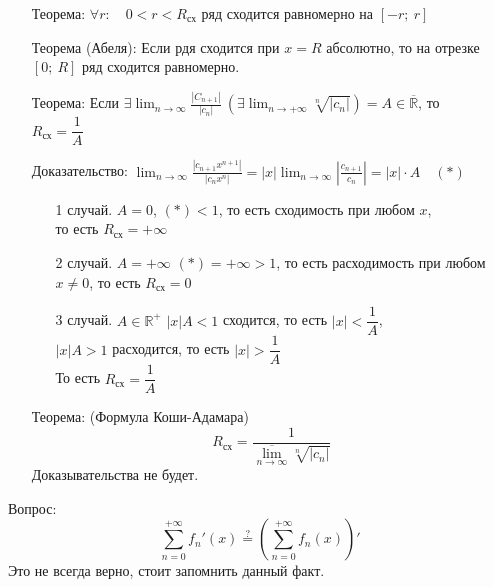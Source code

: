 \documentclass[12pt, letterpaper, twoside]{article}
\newcommand{\DS}{\displaystyle}
\newcommand{\oo}{\infty}
\newcommand{\Abs}[1]{\left| #1 \right|}
\newcommand{\mb}[1]{\mathbb{#1}}
\begin{document}
    \begin{enumerate}
        \item[Теорема:] $\forall r:\quad 0 < r < R_{\text{сх}}$ ряд сходится равномерно на $[-r;\ r]$
        \item[Теорема (Абеля):] Если рдя сходится при $x = R$ абсолютно, то на отрезке $[0;\ R]$ ряд сходится равномерно.
        \item[Теорема:] Если $\exists \DS \lim_{n\rightarrow \oo} \frac{\Abs{C_{n + 1}}}{\Abs{c_n}}\ (\exists \DS \lim_{n\rightarrow +\oo} \sqrt[n]{|c_n|}) = A \in \overline{\mb{R}}$, то\\
        $R_{\text{сх}} = \dfrac{1}{A}$
        \item[Доказательство:] $\DS \lim_{n\rightarrow \oo} \frac{\Abs{c_{n + 1} x^{n + 1}}}{\Abs{c_n x^n}} = \Abs{x} \lim_{n\rightarrow \oo} \Abs{\frac{c_{n  +1}}{c_n}} = \Abs{x}\cdot A\quad (*)$\\
        \begin{enumerate}
            \item[1 случай.] $A = 0$, $(*) < 1$, то есть сходимость при любом $x$,\\
            то есть $R_{\text{сх}} = +\oo$
            \item[2 случай.] $A = +\oo$ $(*) = +\oo > 1$, то есть расходимость при любом $x\neq 0$, то есть $R_{\text{сх}} = 0$
            \item[3 случай.] $A\in \mb{R}^+$ $|x| A < 1$ сходится, то есть $\Abs{x} < \dfrac{1}{A}$,\\
            $\Abs{x} A > 1$ расходится, то есть $\Abs{x} > \dfrac{1}{A}$\\
            То есть $R_{\text{сх}} = \dfrac{1}{A}$ 
        \end{enumerate}
        \item[Теорема:] (Формула Коши-Адамара)
        \[R_{\text{сх}} = \frac{1}{\overline{\lim\limits_{n\rightarrow \oo}}\sqrt[n]{\Abs{c_n}}}\]
        Доказывательства не будет.
    \end{enumerate}
    Вопрос:
    \[\sum_{n = 0}^{+\oo} f_n'(x) \overset{?}{=} \left( \sum_{n = 0}^{+\oo} f_n(x) \right)'\]
    Это не всегда верно, стоит запомнить данный факт.
\end{document}

